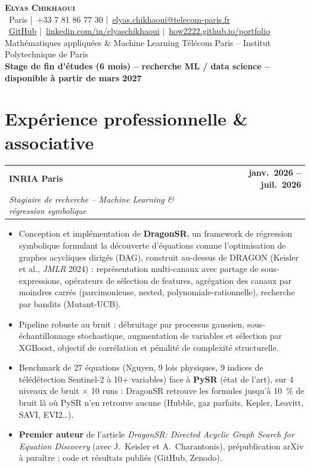 \documentclass[a4paper,10pt]{article}
\makeatletter
\newcommand{\myname}{Elyas Chikhaoui}
\newcommand{\myphone}{+33 7 81 86 77 30}
\newcommand{\mymail}{elyas.chikhaoui@telecom-paris.fr}
\newcommand{\mygithub}{how2222}
\newcommand{\mylinkedin}{elyaschikhaoui}
\newcommand{\mysite}{how2222.github.io/portfolio}
\newcommand{\cventry}[4]{%
  \noindent
  \begin{tabularx}{\textwidth}{@{}X@{\hspace{6pt}}r@{}}
    \textbf{#1} & \textbf{#3}\\
    \textit{#2} & \\
  \end{tabularx}
  \par\vspace{-1pt}
  #4
  \vspace{5pt}
}
\makeatother
\begin{document}
\begin{center}
  {\LARGE\bfseries\scshape \myname}\\[4pt]
  {\small
    \faMapMarker*\ Paris
    \quad\textcolor{muted}{|}\quad \faPhone\ \myphone
    \quad\textcolor{muted}{|}\quad \faEnvelope\ \href{mailto:\mymail}{\mymail}
  }\\[3pt]
  {\small
    \faGithub\ \href{https://github.com/\mygithub}{GitHub}
    \quad\textcolor{muted}{|}\quad \faLinkedin\ \href{https://www.linkedin.com/in/\mylinkedin}{linkedin.com/in/\mylinkedin}
    \quad\textcolor{muted}{|}\quad \faGlobe\ \href{https://\mysite}{\mysite}
  }\\[4pt]
  {\small\color{muted}
    Math\'ematiques appliqu\'ees \& Machine Learning \textbar{} T\'el\'ecom Paris -- Institut Polytechnique de Paris
  }\\[2pt]
  {\small\bfseries
    Stage de fin d'\'etudes (6 mois) -- recherche ML / data science -- disponible \`a partir de mars 2027
  }
\end{center}

\section{Exp\'erience professionnelle \& associative}

\cventry{INRIA Paris}%
  {Stagiaire de recherche -- Machine Learning \& r\'egression symbolique}{janv.~2026 -- juil.~2026}{%
  \begin{itemize}
    \item Conception et impl\'ementation de \textbf{DragonSR}, un framework de r\'egression symbolique formulant la d\'ecouverte d'\'equations comme l'optimisation de graphes acycliques dirig\'es (DAG), construit au-dessus de DRAGON (Keisler et al., \textit{JMLR} 2024) : repr\'esentation multi-canaux avec partage de sous-expressions, op\'erateurs de s\'election de features, agr\'egation des canaux par moindres carr\'es (parcimonieuse, nested, polynomiale-rationnelle), recherche par bandits (Mutant-UCB).
    \item Pipeline robuste au bruit : d\'ebruitage par processus gaussien, sous-\'echantillonnage stochastique, augmentation de variables et s\'election par XGBoost, objectif de corr\'elation et p\'enalit\'e de complexit\'e structurelle.
    \item Benchmark de 27 \'equations (Nguyen, 9 lois physiques, 9 indices de t\'el\'ed\'etection Sentinel-2 \`a 10+ variables) face \`a \textbf{PySR} (\'etat de l'art), sur 4 niveaux de bruit $\times$ 10 runs : DragonSR retrouve les formules jusqu'\`a 10~\% de bruit l\`a o\`u PySR n'en retrouve aucune (Hubble, gaz parfaits, Kepler, Leavitt, SAVI, EVI2\ldots).
    \item \textbf{Premier auteur} de l'article \textit{DragonSR: Directed Acyclic Graph Search for Equation Discovery} (avec J.~Keisler et A.~Charantonis), pr\'epublication arXiv \`a para\^itre ; code et r\'esultats publi\'es (GitHub, Zenodo).
  \end{itemize}
}
\end{document}
